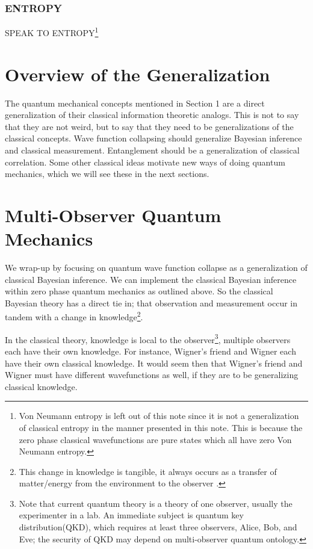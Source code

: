 \documentclass[12pt,a4paper]{article}
\begin{document}
\subsubsection{ENTROPY}
SPEAK TO ENTROPY\footnote{Von Neumann entropy is left out of this note since it is not a generalization of classical entropy in the manner presented in this note.  This is because the zero phase classical wavefunctions are pure states which all have zero Von Neumann entropy.}

\section{Overview of the Generalization}

The quantum mechanical concepts mentioned in Section 1 are a direct generalization of their classical information theoretic analogs.  This is not to say that they are not weird, but to say that they need to be generalizations of the classical concepts.  Wave function collapsing should generalize Bayesian inference and classical measurement.  Entanglement should be a generalization of classical correlation.  Some other classical ideas motivate new ways of doing quantum mechanics, which we will see these in the next sections.

\section{Multi-Observer Quantum Mechanics}
We wrap-up by focusing on quantum wave function collapse as a generalization of classical Bayesian inference.  We can implement the classical Bayesian inference within zero phase quantum mechanics as outlined above.  So the classical Bayesian theory has a direct tie in; that observation and measurement occur in tandem with a change in knowledge\footnote{This change in knowledge is tangible, it always occurs as a transfer of matter/energy from the environment to the observer \cite{thrust}.}.  

In the classical theory, knowledge is local to the observer\footnote{Note that current quantum theory is a theory of one observer, usually the experimenter in a lab.  An immediate subject is quantum key distribution(QKD), which requires at least three observers, Alice, Bob, and Eve; the security of QKD may depend on multi-observer quantum ontology.}, multiple observers each have their own knowledge.  For instance, Wigner's friend and Wigner each have their own classical knowledge.  It would seem then that Wigner's friend and Wigner must have different wavefunctions as well, if they are to be generalizing classical knowledge.
\end{document}
